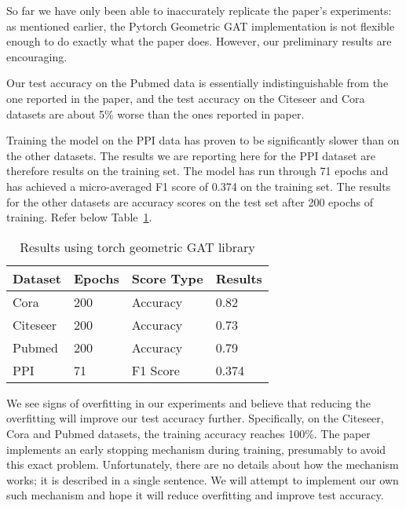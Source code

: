 So far we have only been able to inaccurately replicate the paper's
experiments: as mentioned earlier, the Pytorch Geometric GAT implementation is
not flexible enough to do exactly what the paper does.
However, our preliminary results are encouraging.

Our test accuracy on the Pubmed data is essentially
indistinguishable from the one reported in the paper, and the test accuracy on
the Citeseer and Cora datasets are about 5\% worse than the ones reported in
paper.

Training the model on the PPI data has proven to be significantly slower than on the other datasets.
The results we are reporting here for the PPI dataset are therefore results on the training set.
The model has run through 71 epochs and has achieved a micro-averaged F1 score of 0.374 on the training set.
The results for the other datasets are accuracy scores on the test set after 200 epochs of training.
Refer below Table~\ref{tab:results-table}.

\begin{table}
    \centering
    \begin{tabular}{@{}llll@{}}
        \toprule
        \textbf{Dataset} & \textbf{Epochs} & \textbf{Score Type} & \textbf{Results} \\
        \midrule
        Cora             & 200             & Accuracy            &      {0.82}    \\
        Citeseer         & 200             & Accuracy            &      {0.73}    \\
        Pubmed           & 200             & Accuracy            &      {0.79}    \\
        PPI              & 71              & F1 Score            &      {0.374}   \\
        \bottomrule

    \end{tabular}
    \caption{Results using torch geometric GAT library}
    \label{tab:results-table}
\end{table}

We see signs of overfitting in our experiments and believe that reducing the overfitting will improve our test accuracy further.
Specifically, on the Citeseer, Cora and Pubmed datasets, the training accuracy reaches 100\%.
The paper implements an early stopping mechanism during training, presumably to avoid this exact problem.
Unfortunately, there are no details about how the mechanism works; it is described in a single sentence.
We will attempt to implement our own such mechanism and hope it will reduce overfitting and improve test accuracy.
